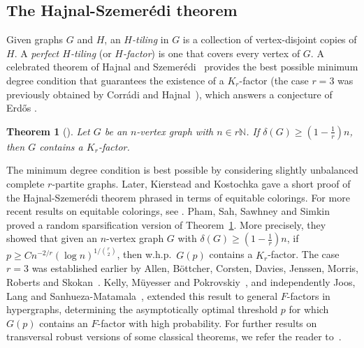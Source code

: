 \documentclass[11pt, a4paper]{article}
\newtheorem{theorem}{Theorem}[section]
\theoremstyle{definition}
\newcommand{\<}{\subseteq}
\begin{document}
\subsection{The Hajnal-Szemer\'edi theorem}
Given graphs $G$ and $H$, an \textit{$H$-tiling} in $G$ is a collection of vertex-disjoint copies of $H$. 
A \textit{perfect $H$-tiling} (or \textit{$H$-factor}) is one that covers every vertex of $G$.  A celebrated theorem of Hajnal and Szemer\'edi~\cite{HajnalSz} provides the best possible minimum degree condition that guarantees the existence of a $K_r$-factor (the case $r=3$ was previously obtained by Corr\'adi and Hajnal~\cite{Corradi}), {which answers a conjecture of Erd\H{o}s \cite{E1964}. }%
\begin{theorem}[\cite{Corradi, HajnalSz}]
\label{thm:HSz}
Let $G$ be an $n$-vertex graph with $n\in r\mathbb{N}$. If $\delta(G)\ge \left(1-\frac{1}{r}\right)n$, then $G$ contains a $K_r$-factor.
\end{theorem}


The minimum degree condition is best possible by considering slightly unbalanced complete $r$-partite graphs. Later, Kierstead and Kostochka \cite{Kierstead2008} gave a short proof of the Hajnal-Szemer\'edi theorem phrased in terms of equitable colorings. {For more recent results on equitable colorings, see \cite{cheng2025,kierstead-survey}.} %
Pham, Sah, Sawhney and Simkin~\cite{Pham2} proved a random sparsification version of Theorem~\ref{thm:HSz}.  
More precisely, they showed that given an $n$-vertex graph $G$ with $\delta(G)\ge \left(1-\frac{1}{r}\right)n$, 
if $p\ge Cn^{-2/r}(\log n)^{1/{r \choose 2}}$, then w.h.p.~$G(p)$ contains a $K_r$-factor.  
The case $r=3$ was established earlier by Allen, Böttcher, Corsten, Davies, Jenssen, Morris, Roberts and Skokan~\cite{Allen}. 
{Kelly, M\"uyesser and Pokrovskiy~\cite{Kelly2024}, and independently Joos, Lang and Sanhueza-Matamala~\cite{Joos-Lang2023},  extended this result to general $F$-factors in hypergraphs, determining the  {asymptotically} optimal threshold $p$ for which  $G(p)$ contains an $F$-factor with high probability. For further results on transversal robust versions of some classical theorems, we refer the reader to~\cite{Anastos-Chakraborti, Ferber2022, Han2025}. 
}%
\end{document}

